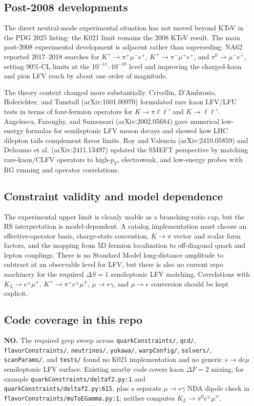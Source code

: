 \subsection*{Post-2008 developments}
The direct neutral-mode experimental situation has not moved beyond KTeV in
the PDG 2025 listing: the K021 limit remains the 2008 KTeV result.  The main
post-2008 experimental development is adjacent rather than superseding: NA62
reported 2017--2018 searches for \(K^+\to\pi^+\mu^-e^+\),
\(K^+\to\pi^-\mu^+e^+\), and \(\pi^0\to\mu^-e^+\), setting
\(90\%\)-CL limits at the \(10^{-11}\)--\(10^{-10}\) level and improving the
charged-kaon and pion LFV reach by about one order of magnitude.

The theory context changed more substantially.  Crivellin, D'Ambrosio,
Hoferichter, and Tunstall (arXiv:1601.00970) formulated rare kaon LFV/LFU
tests in terms of four-fermion operators for \(K\to\pi\ell\ell'\) and
\(K\to\ell\ell'\).  Angelescu, Faroughy, and Sumensari (arXiv:2002.05684)
gave numerical low-energy formulae for semileptonic LFV meson decays and
showed how LHC dilepton tails complement flavor limits.  Roy and Valencia
(arXiv:2410.05859) and Delzanno et al. (arXiv:2411.13497) updated the SMEFT
perspective by matching rare-kaon/CLFV operators to high-\(p_T\), electroweak,
and low-energy probes with RG running and operator correlations.

\subsection*{Constraint validity and model dependence}
The experimental upper limit is cleanly usable as a branching-ratio cap, but
the RS interpretation is model-dependent.  A catalog implementation must choose
an effective-operator basis, charge-state convention, \(K\to\pi\) vector and
scalar form factors, and the mapping from 5D fermion localization to
off-diagonal quark and lepton couplings.  There is no Standard Model
long-distance amplitude to subtract at an observable level for LFV, but there
is also no current repo machinery for the required \(\Delta S=1\) semileptonic
LFV matching.  Correlations with \(K_L\to e^\pm\mu^\mp\),
\(K^+\to\pi^+e^\pm\mu^\mp\), \(\mu\to e\gamma\), and \(\mu\to e\) conversion
should be kept explicit.

\subsection*{Code coverage in this repo}
\textbf{NO.}  The required grep sweep across \texttt{quarkConstraints/},
\texttt{qcd/}, \texttt{flavorConstraints/}, \texttt{neutrinos/},
\texttt{yukawa/}, \texttt{warpConfig/}, \texttt{solvers/},
\texttt{scanParams/}, and \texttt{tests/} found no K021 implementation and no
generic \(s\to d e\mu\) semileptonic LFV surface.  Existing nearby code covers
kaon \(\Delta F=2\) mixing, for example
\texttt{quarkConstraints/deltaf2.py:1} and
\texttt{quarkConstraints/deltaf2.py:615}, plus a separate \(\mu\to e\gamma\)
NDA dipole check in \texttt{flavorConstraints/muToEGamma.py:1}; neither
computes \(K_L\to\pi^0 e^\pm\mu^\mp\).

